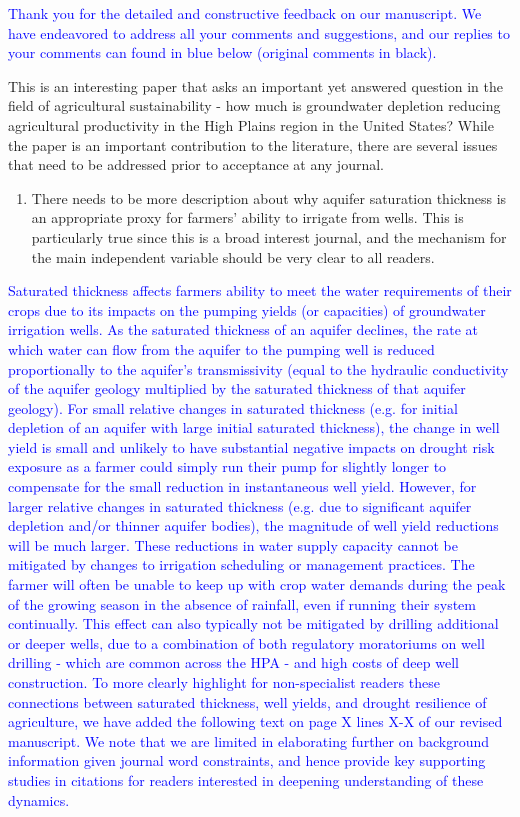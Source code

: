 \documentclass[
]{article}
\author{}
\date{\vspace{-2.5em}}
\providecommand{\tightlist}{%
  \setlength{\itemsep}{0pt}\setlength{\parskip}{0pt}}
\begin{document}
\textcolor{blue}{Thank you for the detailed and constructive feedback on our manuscript. We have endeavored to address all your comments and suggestions, and our replies to your comments can found in blue below (original comments in black).}

This is an interesting paper that asks an important yet answered
question in the field of agricultural sustainability - how much is
groundwater depletion reducing agricultural productivity in the High
Plains region in the United States? While the paper is an important
contribution to the literature, there are several issues that need to be
addressed prior to acceptance at any journal.

\begin{enumerate}
\def\labelenumi{\arabic{enumi}.}
\tightlist
\item
  There needs to be more description about why aquifer saturation
  thickness is an appropriate proxy for farmers' ability to irrigate
  from wells. This is particularly true since this is a broad interest
  journal, and the mechanism for the main independent variable should be
  very clear to all readers.
\end{enumerate}

\textcolor{blue}{Saturated thickness affects farmers ability to meet the water requirements of their crops due to its impacts on the pumping yields (or capacities) of groundwater irrigation wells. As the saturated thickness of an aquifer declines, the rate at which water can flow from the aquifer to the pumping well is reduced proportionally to the aquifer's transmissivity (equal to the hydraulic conductivity of the aquifer geology multiplied by the saturated thickness of that aquifer geology). For small relative changes in saturated thickness (e.g. for initial depletion of an aquifer with large initial saturated thickness), the change in well yield is small and unlikely to have substantial negative impacts on drought risk exposure as a farmer could simply run their pump for slightly longer to compensate for the small reduction in instantaneous well yield. However, for larger relative changes in saturated thickness (e.g. due to significant aquifer depletion and/or thinner aquifer bodies), the magnitude of well yield reductions will be much larger. These reductions in water supply capacity cannot be mitigated by changes to irrigation scheduling or management practices. The farmer will often be unable to keep up with crop water demands during the peak of the growing season in the absence of rainfall, even if running their system continually. This effect can also typically not be mitigated by drilling additional or deeper wells, due to a combination of both regulatory moratoriums on well drilling - which are common across the HPA - and high costs of deep well construction. To more clearly highlight for non-specialist readers these connections between saturated thickness, well yields, and drought resilience of agriculture, we have added the following text on page X lines X-X of our revised manuscript. We note that we are limited in elaborating further on background information given journal word constraints, and hence provide key supporting studies in citations for readers interested in deepening understanding of these dynamics.}
\end{document}
